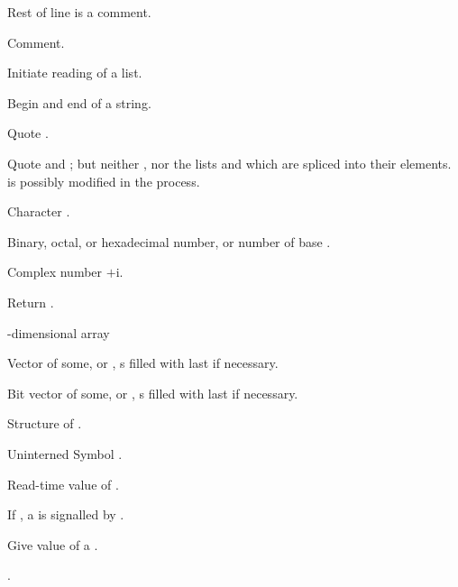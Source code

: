 \begin{LIST}{1cm}

  Rest of line is a comment.

  Comment.

  \IT{\KWD*{(}}
  Initiate reading of a list.

  Begin and end of a string.

   Quote .

  Quote  and ; but neither , nor the lists
   and  which are spliced into their
  elements.  is possibly modified in the process.

  Character .

  Binary, octal, or hexadecimal number, or number of base . 

   Complex number $+$i.

  Return .

  -dimensional array

  \index{\#(}%
  Vector of some, or ,
  s filled with last  if necessary.

  \index{\#*}%
  Bit vector of some, or ,
  s filled with last  if necessary.

  Structure of .

  Uninterned Symbol .

  Read-time value of .

  If \NIL, a  is signalled by .

  \index{\#=}%
  Give value of  a .

  \index{\#\#}%
  .


\end{LIST}
